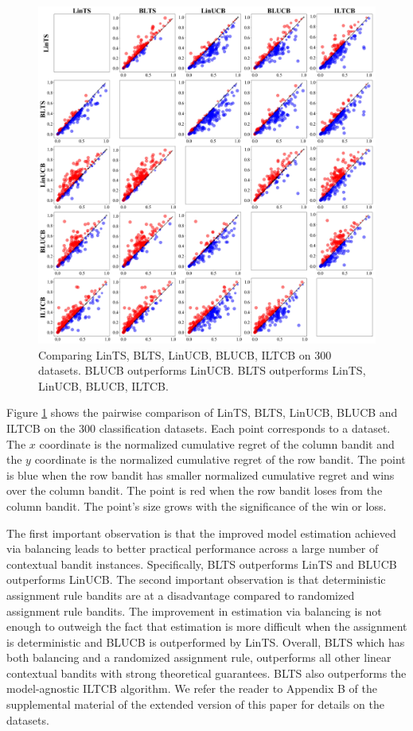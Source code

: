 \documentclass[letterpaper]{article} %
\begin{document}
\begin{figure}[!htb]
\centering
\includegraphics[width=0.95\columnwidth]{Figures/all_vs_all}
\caption{Comparing LinTS, BLTS, LinUCB, BLUCB, ILTCB on 300 datasets. BLUCB outperforms LinUCB. BLTS outperforms LinTS, LinUCB, BLUCB, ILTCB.}
\label{fig:all_vs_all}
\end{figure}

Figure \ref{fig:all_vs_all} shows the pairwise comparison of LinTS, BLTS, LinUCB, BLUCB and ILTCB on the 300 classification datasets. Each point corresponds to a dataset. The $x$ coordinate is the normalized cumulative regret of the column bandit and the $y$ coordinate is the normalized cumulative regret of the row bandit. The point is blue when the row bandit has smaller normalized cumulative regret and wins over the column bandit. The point is red when the row bandit loses from the column bandit. The point's size grows with the significance of the win or loss. 

The first important observation is that the improved model estimation achieved via balancing leads to better practical performance across a large number of contextual bandit instances. Specifically, BLTS outperforms LinTS and BLUCB outperforms LinUCB.
The second important observation is that deterministic assignment rule bandits are at a disadvantage compared to randomized assignment rule bandits. The improvement in estimation via balancing is not enough to outweigh the fact that estimation is more difficult when the assignment is deterministic and BLUCB is outperformed by LinTS.
Overall, BLTS which has both balancing and a randomized assignment rule, outperforms all other linear contextual bandits with strong theoretical guarantees.
BLTS also outperforms the model-agnostic ILTCB algorithm.
We refer the reader to Appendix B of the supplemental material of the extended version of this paper \cite{dimakopoulou2017estimation} for details on the datasets.
\end{document}
